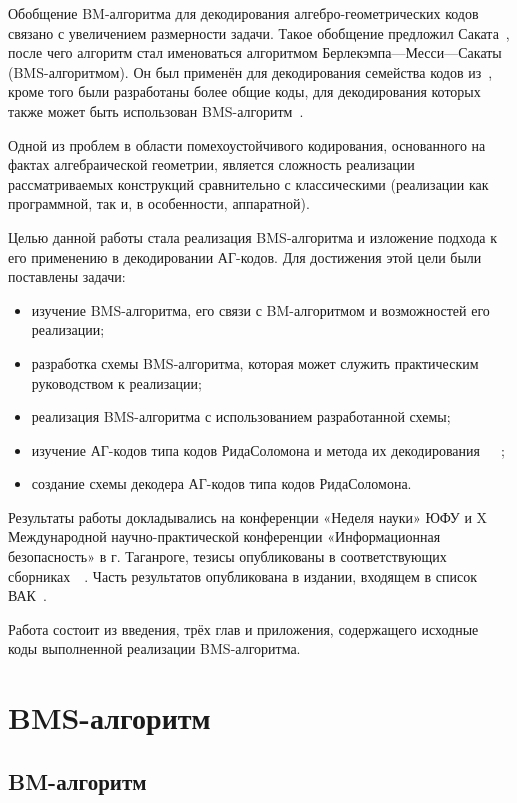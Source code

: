\documentclass[14pt]{extarticle}
\begin{document}
Обобщение BM-алгоритма для декодирования алгебро-\nspace геометрических кодов
связано с увеличением размерности задачи. Такое обобщение предложил
Саката~\cite{Sakata88}, после чего алгоритм стал именоваться алгоритмом
Берлекэмпа—Месси—Сакаты (BMS-алгоритмом). Он был применён для декодирования
семейства кодов из~\cite{Justesen89}, кроме того были разработаны более общие
коды, для декодирования которых также может быть использован
BMS-ал\-го\-ритм~\cite{OSullivan01}.

Одной из проблем в области помехоустойчивого кодирования, основанного на фактах
алгебраической геометрии, является сложность реализации рассматриваемых
конструкций сравнительно с классическими (реализации как программной,
так и, в особенности, аппаратной).

Целью данной работы стала реализация BMS-алгоритма и изложение подхода к его
применению в декодировании АГ\nobreakdash-кодов. Для достижения этой цели были
поставлены задачи:
\begin{itemize}
	\item изучение BMS-алгоритма, его связи с BM-алгоритмом и возможностей его
	реализации;
	\item разработка схемы BMS-алгоритма, которая может служить практическим
	руководством к реализации;
	\item реализация BMS-алгоритма с использованием разработанной схемы;
	\item изучение АГ-кодов типа кодов Рида\emd Соломона и метода их 
	декодирования~\cite{Justesen89}~\cite{Justesen92}~\cite{Sakata95};
	\item создание схемы декодера АГ-кодов типа кодов Рида\emd Соломона.
\end{itemize}

Результаты работы докладывались на конференции «Неделя науки» ЮФУ и X
Международной научно-практической конференции «Информационная безопасность» в г.
Таганроге, тезисы опубликованы в соответствующих
сборниках~\cite{Pelenitsyn08a}~\cite{Pelenitsyn08b}. Часть результатов 
опубликована в издании, входящем в список ВАК~\cite{Pelenitsyn08c}.

Работа состоит из введения, трёх глав и приложения, содержащего исходные коды
выполненной реализации BMS-алгоритма.

\section{BMS-алгоритм}

\subsection{BM-алгоритм}
\label{BMalg}
\end{document}
